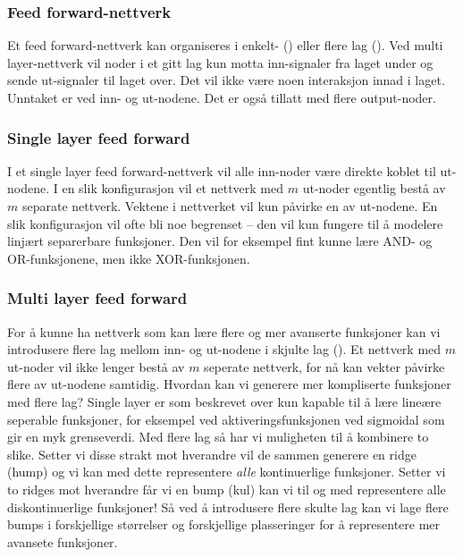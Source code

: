 \subsubsection{Feed forward-nettverk}

Et feed forward-nettverk kan organiseres i enkelt- () eller flere lag (). Ved multi layer-nettverk vil noder i et gitt lag kun motta inn-signaler fra laget under og sende ut-signaler til laget over. Det vil ikke være noen interaksjon innad i laget. Unntaket er ved inn- og ut-nodene. Det er også tillatt med flere output-noder. 

\subsubsection{Single layer feed forward} I et single layer feed forward-nettverk vil alle inn-noder være direkte koblet til ut-nodene. I en slik konfigurasjon vil et nettverk med $m$ ut-noder egentlig bestå av $m$ separate nettverk. Vektene i nettverket vil kun påvirke en av ut-nodene. En slik konfigurasjon vil ofte bli noe begrenset -- den vil kun fungere til å modelere linjært separerbare funksjoner. Den vil for eksempel fint kunne lære AND- og OR-funksjonene, men ikke XOR-funksjonen.

\subsubsection{Multi layer feed forward} For å kunne ha nettverk som kan lære flere og mer avanserte funksjoner kan vi introdusere flere lag mellom inn- og ut-nodene i skjulte lag (). Et nettverk med $m$ ut-noder vil ikke lenger bestå av $m$ seperate nettverk, for nå kan vekter påvirke flere av ut-nodene samtidig. Hvordan kan vi generere mer kompliserte funksjoner med flere lag? Single layer er som beskrevet over kun kapable til å lære lineære seperable funksjoner, for eksempel ved aktiveringsfunksjonen ved sigmoidal som gir en myk grenseverdi. Med flere lag så har vi muligheten til å kombinere to slike. Setter vi disse strakt mot hverandre vil de sammen generere en ridge (hump) og vi kan med dette representere \textit{alle} kontinuerlige funksjoner. Setter vi to ridges mot hverandre får vi en bump (kul) kan vi til og med representere alle diskontinuerlige funksjoner! Så ved å introdusere flere skulte lag kan vi lage flere bumps i forskjellige størrelser og forskjellige plasseringer for å representere mer avansete funksjoner. 

